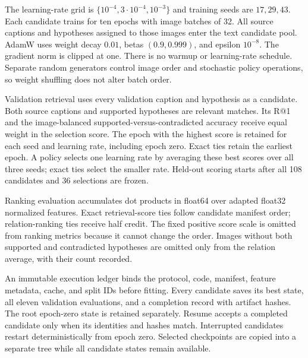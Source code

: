 The learning-rate grid is $\{10^{-4},3\cdot10^{-4},10^{-3}\}$ and training seeds are $17,29,43$. Each candidate trains for ten epochs with image batches of 32. All source captions and hypotheses assigned to those images enter the text candidate pool. AdamW uses weight decay $0.01$, betas $(0.9,0.999)$, and epsilon $10^{-8}$. The gradient norm is clipped at one. There is no warmup or learning-rate schedule. Separate random generators control image order and stochastic policy operations, so weight shuffling does not alter batch order.

Validation retrieval uses every validation caption and hypothesis as a candidate. Both source captions and supported hypotheses are relevant matches. Its R@1 and the image-balanced supported-versus-contradicted accuracy receive equal weight in the selection score. The epoch with the highest score is retained for each seed and learning rate, including epoch zero. Exact ties retain the earliest epoch. A policy selects one learning rate by averaging these best scores over all three seeds; exact ties select the smaller rate. Held-out scoring starts after all 108 candidates and 36 selections are frozen.

Ranking evaluation accumulates dot products in float64 over adapted float32 normalized features. Exact retrieval-score ties follow candidate manifest order; relation-ranking ties receive half credit. The fixed positive score scale is omitted from ranking metrics because it cannot change the order. Images without both supported and contradicted hypotheses are omitted only from the relation average, with their count recorded.

An immutable execution ledger binds the protocol, code, manifest, feature metadata, cache, and split IDs before fitting. Every candidate saves its best state, all eleven validation evaluations, and a completion record with artifact hashes. The root epoch-zero state is retained separately. Resume accepts a completed candidate only when its identities and hashes match. Interrupted candidates restart deterministically from epoch zero. Selected checkpoints are copied into a separate tree while all candidate states remain available.
